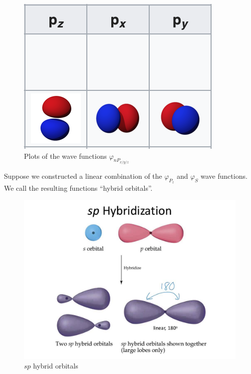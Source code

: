 \documentclass[a4paper,twoside,master.tex]{subfiles}
\begin{document}
\begin{figure}[h]
    \centering
    \includegraphics[width=\textwidth/2]{figures/lec_45_pxpypz.png}
    \caption{Plots of the wave functions $ \varphi_{nP_{x/y/z}} $}
    \label{fig:pxpypz_plots}
\end{figure}

Suppose we constructed a linear combination of the $ \varphi_{P_z} $ and $ \varphi_{S} $ wave functions. We call the resulting functions ``hybrid orbitals''.

\begin{figure}[h]
    \centering
    \includegraphics[width=\textwidth/2]{figures/lec_45_sp_hybrid.jpg}
    \caption{$ sp $ hybrid orbitals}
    \label{fig:sp_hybrid_orbitals}
\end{figure}
\end{document}
